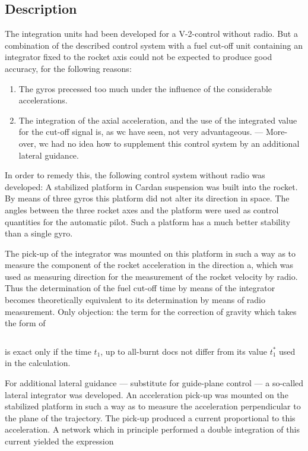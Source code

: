 \documentclass[12pt, a4paper]{article}
\begin{document}
\subsection{Description}

The integration units had been developed for a V-2-control without radio. But a combination of the described control system with a fuel cut-off unit containing an integrator fixed to the rocket axis could not be expected to produce good accuracy, for the following reasons:

\begin{enumerate}
  \item The gyros precessed too much under the influence of the considerable accelerations.

  \item The integration of the axial acceleration, and the use of the integrated value for the cut-off signal is, as wc have seen, not very advantageous. — More- over, wc had no idea how to supplement this control system by an additional lateral guidance.
\end{enumerate}

In order to remedy this, the following control system without radio was developed: A stabilized platform in Cardan suspension was built into the rocket. By means of three gyros this platform did not alter its direction in space. The angles between the three rocket axes and the platform were used as control quantities for the automatic pilot. Such a platform has a much better stability than a single gyro.

The pick-up of the integrator was mounted on this platform in such a way as to measure the component of the rocket acceleration in the direction a, which was used as measuring direction for the measurement of the rocket velocity by radio. Thus the determination of the fuel cut-off time by means of the integrator becomes theoretically equivalent to its determination by means of radio measurement. Only objection: the term for the correction of gravity which takes the form of

\begin{equation}
\end{equation}

is exact only if the time $t_{1}$, up to all-burnt docs not differ from its value $t_{1}^{*}$ used
in the calculation.

For additional lateral guidance — substitute for guide-plane control — a so-called lateral integrator was developed. An acceleration pick-up was mounted on the stabilized platform in such a way as to measure the acceleration perpendicular to the plane of the trajectory. The pick-up produced a current proportional to this acceleration. A network which in principle performed a double integration of this current yielded the expression
\end{document}
